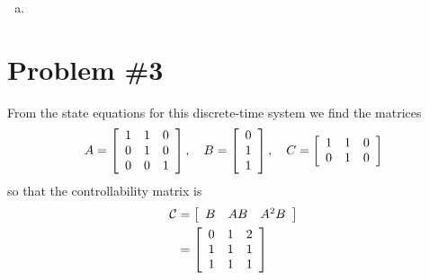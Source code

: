 \documentclass{article}
\begin{document}
\begin{enumerate}[(a)]
{%
%
  }
  \item{    
  }
\end{enumerate}

\pagebreak

\section*{Problem \#3}
From the state equations for this discrete-time system
we find the matrices
$$
A = 
\left[\begin{array}{c c c}
  1 & 1 & 0 \\
  0 & 1 & 0 \\
  0 & 0 & 1
\end{array}\right], \quad
B =
\left[\begin{array}{c}
  0 \\ 1 \\ 1
\end{array}\right], \quad
C =
\left[\begin{array}{c c c}
  1 & 1 & 0 \\
  0 & 1 & 0
\end{array}\right]
$$
so that the controllability matrix is
\begin{align*}
\mathcal{C} &=
\left[\begin{array}{c c c}
  B & A B & A^2 B
\end{array}\right] \\
&=
\left[\begin{array}{c c c}
  0 & 1 & 2 \\
  1 & 1 & 1 \\
  1 & 1 & 1
\end{array}\right]
\end{align*}
\end{document}
